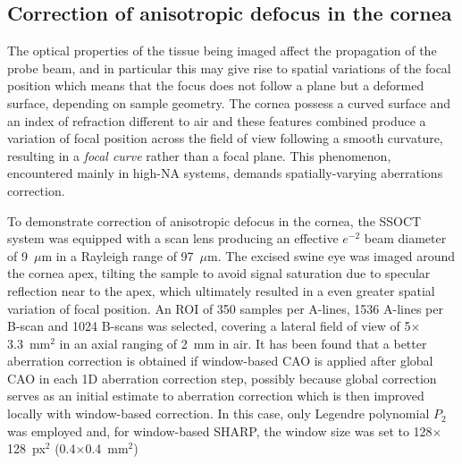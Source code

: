 \FloatBarrier

\subsection{Correction of anisotropic defocus in the cornea}\label{sec:CorneaImaging}

The optical properties of the tissue being imaged affect the propagation of the probe beam, and in particular this may give rise to spatial variations of the focal position which means that the focus does not follow a plane but a deformed surface, depending on sample geometry. The cornea possess a curved surface and an index of refraction different to air and these features combined produce a variation of focal position across the field of view following a smooth curvature, resulting in a \textit{focal curve} rather than a focal plane. This phenomenon, encountered mainly in high-NA systems, demands spatially-varying aberrations correction.

To demonstrate correction of anisotropic defocus in the cornea, the SSOCT system was equipped with a scan lens producing an effective $e^{-2}$ beam diameter of 9~$\mu$m in a Rayleigh range of 97~$\mu$m. The excised swine eye was imaged around the cornea apex, tilting the sample to avoid signal saturation due to specular reflection near to the apex, which ultimately resulted in a even greater spatial variation of focal position. An ROI of 350 samples per A-lines, 1536 A-lines per B-scan and 1024 B-scans was selected, covering a lateral field of view of 5$\times$3.3~mm$^2$ in an axial ranging of 2~mm in air. It has been found that a better aberration correction is obtained if window-based CAO is applied after global CAO in each 1D aberration correction step, possibly because global correction serves as an initial estimate to aberration correction which is then improved locally with window-based correction. In this case, only Legendre polynomial $P_2$ was employed and, for window-based SHARP, the window size was set to 128$\times$128~px$^2$ (0.4$\times$0.4~mm$^2$)

